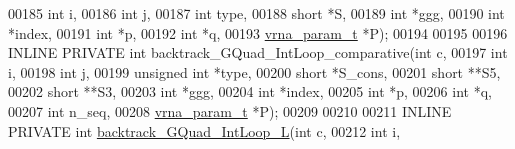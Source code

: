 \begin{DoxyCode}
00185                                            \textcolor{keywordtype}{int}          i,
00186                                            \textcolor{keywordtype}{int}          j,
00187                                            \textcolor{keywordtype}{int}          type,
00188                                            \textcolor{keywordtype}{short}        *S,
00189                                            \textcolor{keywordtype}{int}          *ggg,
00190                                            \textcolor{keywordtype}{int}          *index,
00191                                            \textcolor{keywordtype}{int}          *p,
00192                                            \textcolor{keywordtype}{int}          *q,
00193                                            \hyperlink{group__energy__parameters_structvrna__param__s}{vrna\_param\_t} *P);
00194 
00195 
00196 INLINE PRIVATE \textcolor{keywordtype}{int} backtrack\_GQuad\_IntLoop\_comparative(\textcolor{keywordtype}{int}          c,
00197                                                        \textcolor{keywordtype}{int}          i,
00198                                                        \textcolor{keywordtype}{int}          j,
00199                                                        \textcolor{keywordtype}{unsigned} \textcolor{keywordtype}{int} *type,
00200                                                        \textcolor{keywordtype}{short}        *S\_cons,
00201                                                        \textcolor{keywordtype}{short}        **S5,
00202                                                        \textcolor{keywordtype}{short}        **S3,
00203                                                        \textcolor{keywordtype}{int}          *ggg,
00204                                                        \textcolor{keywordtype}{int}          *index,
00205                                                        \textcolor{keywordtype}{int}          *p,
00206                                                        \textcolor{keywordtype}{int}          *q,
00207                                                        \textcolor{keywordtype}{int}          n\_seq,
00208                                                        \hyperlink{group__energy__parameters_structvrna__param__s}{vrna\_param\_t} *P);
00209 
00210 
00211 INLINE PRIVATE \textcolor{keywordtype}{int} \hyperlink{group__gquads_ga7b371308fa5a45c7ac353ef6ed1014de}{backtrack\_GQuad\_IntLoop\_L}(\textcolor{keywordtype}{int}          c,
00212                                              \textcolor{keywordtype}{int}          i,

\end{DoxyCode}

